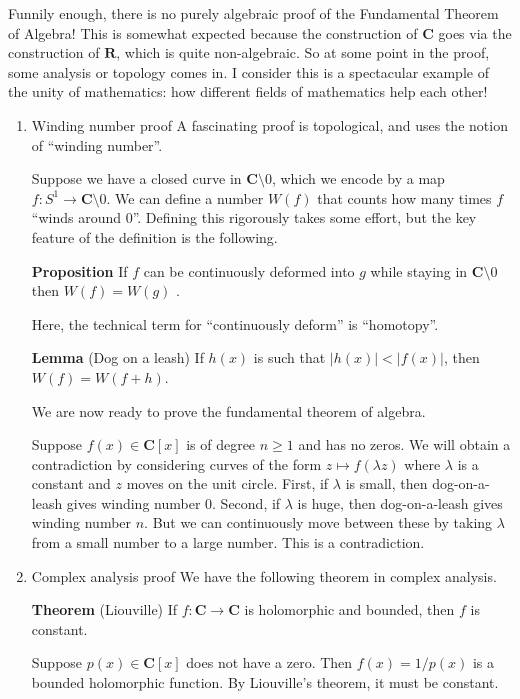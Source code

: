 \documentclass[11pt]{article}
\begin{document}
Funnily enough, there is no purely algebraic proof of the Fundamental Theorem of Algebra!
This is somewhat expected because the construction of \(\mathbf{C}\) goes via the construction of \(\mathbf{R}\), which is quite non-algebraic.
So at some point in the proof, some analysis or topology comes in.
I consider this is a spectacular example of the unity of mathematics: how different fields of mathematics help each other!
\begin{enumerate}
\item Winding number proof
\label{sec:orgc85175c}
A fascinating proof is topological, and uses the notion of ``winding number''.

Suppose we have a closed curve in \(\mathbf{C} \setminus 0\), which we encode by a map \(f \colon S^1 \to \mathbf{C} \setminus 0\).
We can define a number \(W(f)\) that counts how many times \(f\) ``winds around 0''.
Defining this rigorously takes some effort, but the key feature of the definition is the following.

\textbf{\textbf{Proposition}} If \(f\) can be continuously deformed into \(g\) while staying in \(\mathbf{C} \setminus 0\) then \(W(f) = W(g)\) .

Here, the technical term for ``continuously deform'' is ``homotopy''.

\textbf{\textbf{Lemma}} (Dog on a leash)
If \(h(x)\) is such that \(|h(x)| < |f(x)|\), then \(W(f) = W(f+h)\).

We are now ready to prove the fundamental theorem of algebra.

Suppose \(f(x) \in \mathbf{C}[x]\) is of degree \(n \geq 1\) and has no zeros.
We will obtain a contradiction by considering curves of the form \(z \mapsto f(\lambda z)\) where \(\lambda\) is a constant and \(z\) moves on the unit circle.
First, if \(\lambda\) is small, then dog-on-a-leash gives winding number 0.
Second, if \(\lambda\) is huge, then dog-on-a-leash gives winding number \(n\).
But we can continuously move between these by taking \(\lambda\) from a small number to a large number.
This is a contradiction.
\item Complex analysis proof
\label{sec:org56ad466}
We have the following theorem in complex analysis.

\textbf{\textbf{Theorem}} (Liouville)
If \(f \colon \mathbf{C} \to \mathbf{C}\) is holomorphic and bounded, then \(f\) is constant.

Suppose \(p(x) \in \mathbf{C}[x]\) does not have a zero.
Then \(f(x) = 1/p(x)\) is a bounded holomorphic function.
By Liouville's theorem, it must be constant.
\end{enumerate}
\end{document}
